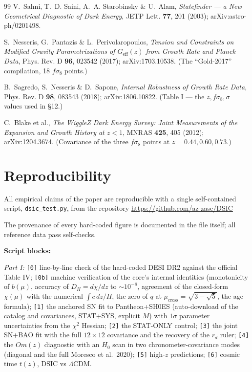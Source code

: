 \documentclass{article}
\begin{document}
\begin{thebibliography}{99}
 V.~Sahni, T.~D. Saini, A.~A. Starobinsky \& U.~Alam, \textit{Statefinder --- a New Geometrical Diagnostic of Dark Energy}, JETP Lett. \textbf{77}, 201 (2003); arXiv:astro-ph/0201498.

 S.~Nesseris, G.~Pantazis \& L.~Perivolaropoulos, \textit{Tension and Constraints on Modified Gravity Parametrizations of $G_{\text{eff}}(z)$ from Growth Rate and Planck Data}, Phys. Rev. D \textbf{96}, 023542 (2017); arXiv:1703.10538. (The ``Gold-2017'' compilation, 18 $f\sigma_8$ points.)

 B.~Sagredo, S.~Nesseris \& D.~Sapone, \textit{Internal Robustness of Growth Rate Data}, Phys. Rev. D \textbf{98}, 083543 (2018); arXiv:1806.10822. (Table I --- the $z, f\sigma_8, \sigma$ values used in \S12.)

 C.~Blake et al., \textit{The WiggleZ Dark Energy Survey: Joint Measurements of the Expansion and Growth History at $z < 1$}, MNRAS \textbf{425}, 405 (2012); arXiv:1204.3674. (Covariance of the three $f\sigma_8$ points at $z = 0.44, 0.60, 0.73$.)

\end{thebibliography}

\section*{Reproducibility}

All empirical claims of the paper are reproducible with a single self-contained script, \texttt{dsic\_test.py}, from the repository \url{https://github.com/az-zase/DSIC}

The provenance of every hard-coded figure is documented in the file itself; all reference data pass self-checks.

\medskip
\noindent\textbf{Script blocks:}

\medskip
\noindent\textit{Part I:} \texttt{[0]} line-by-line check of the hard-coded DESI DR2 against the official Table IV; \texttt{[0b]} machine verification of the core's internal identities (monotonicity of $b(\mu)$, accuracy of $D_H = d\chi/dz$ to ${\sim}10^{-8}$, agreement of the closed-form $\chi(\mu)$ with the numerical $\int c\,dz/H$, the zero of $q$ at $\mu_{\text{cross}} = \sqrt{3-\sqrt{5}}$, the age formula); \texttt{[1]} the anchored SN fit to Pantheon+SH0ES (auto-download of the catalog and covariances, STAT+SYS, explicit $M$) with $1\sigma$ parameter uncertainties from the $\chi^2$ Hessian; \texttt{[2]} the STAT-ONLY control; \texttt{[3]} the joint SN+BAO fit with the full $12\times12$ covariance and the recovery of the $r_d$ ruler; \texttt{[4]} the $Om(z)$ diagnostic with an $H_0$ scan in two chronometer-covariance modes (diagonal and the full Moresco et al.\ 2020); \texttt{[5]} high-$z$ predictions; \texttt{[6]} cosmic time $t(z)$, DSIC vs $\Lambda$CDM.
\end{document}
